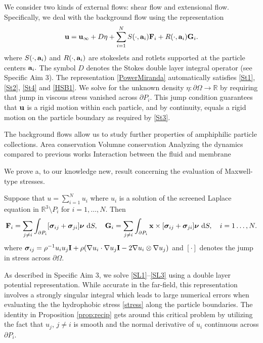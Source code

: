 We consider two kinds of external flows: shear flow and extensional flow. 
Specifically, we deal with the background flow using the representation 
\begin{equation}
\label{PowerMiranda}
{\bf u} = {\bf u}_{\infty} + D\eta + \sum_{i=1}^N S(\cdot, {\bf a}_i) {\bf F}_i + R(\cdot, {\bf a}_i) {\bf G}_i.
\end{equation}
where $S(\cdot, {\bf a}_i)$ and $ R(\cdot, {\bf a}_i)$ are stokeslets and rotlets supported at the particle centers ${\bf a}_i.$
The symbol $D$ denotes the Stokes double layer integral operator (see Specific Aim 3).   
The representation \eqref{PowerMiranda} automatically satisfies \eqref{St1}, \eqref{St2}, \eqref{St4} and \eqref{HSB1}.
We solve for the unknown density $\eta : \partial \Omega \to \mathbb{R}$ by requiring that jump in viscous stress
vanished across $\partial P_i$. This jump condition guarantees that ${\bf u}$ is a rigid motion within each particle,
and by continuity, equals a rigid motion on the particle boundary as required by \eqref{St3}.

The background flows allow us to study further properties of amphiphilic particle collections. 
Area conservation
Volumne conservation
Analyzing the dynamics compared to previous works
Interaction between the fluid and membrane 

We prove a, to our knowledge new, result concerning the evaluation of Maxwell-type stresses. 
\begin{proposition}
  \label{prop:recip}
  Suppose that $u = \sum_{i=1}^N u_i$ where $u_i$ is a solution of the screened Laplace equation
  in $\mathbb{R}^3 \setminus P_i$ for $i=1,\dots, N.$ Then 
\begin{equation}
{\bf F}_i = \sum_{j \neq i} \int_{\partial P_i}[\boldsymbol{\sigma}_{ij} + \boldsymbol{\sigma}_{ji}]\boldsymbol{\nu}\,\dif S,\quad
{\bf G}_i = \sum_{j \neq i} \int_{\partial P_i} {\bf x} \times [\boldsymbol{\sigma}_{ij} + \boldsymbol{\sigma}_{ji}]\boldsymbol{\nu}\,\dif S, \quad i = 1\dots, N.
\end{equation}
where $\boldsymbol{\sigma}_{ij} = \rho^{-1} u_iu_j {\bf I} + \rho(\nabla u_i \cdot \nabla u_j {\bf I} - 2 \nabla u_i \otimes \nabla u_j)$ and
$[\cdot]$ denotes the jump in stress across $\partial \Omega.$ 
\end{proposition}
As described in Specific Aim 3, we solve \eqref{SL1}--\eqref{SL3}  using a double layer potential representation.
While accurate in the far-field, this representation involves a strongly singular integral which
leads to large numerical errors when evaluating the the hydrophobic stress \eqref{stress} along the particle boundaries.
The identity in Proposition \ref{prop:recip} gets around this critical problem by utilizing the fact that $u_j$, $j\neq i$ is smooth and the normal derivative
of  $u_i$ continuous across $\partial P_i$.

